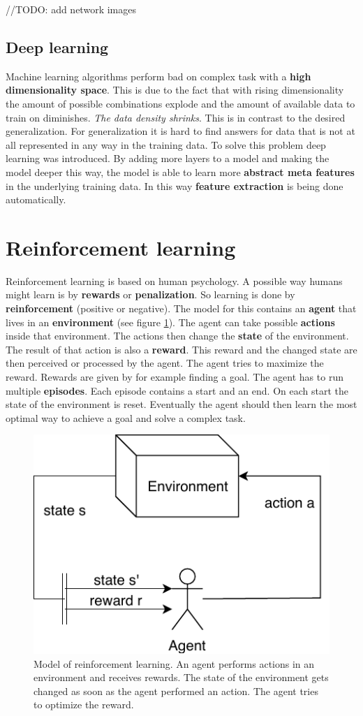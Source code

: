 \documentclass[jou,apacite]{apa6}
\begin{document}
//TODO: add network images

\subsection{Deep learning}
Machine learning algorithms perform bad on complex task with a \textbf{high dimensionality space}. This is due to the fact that with rising dimensionality the amount of possible combinations explode and the amount of available data to train on diminishes. \textit{The data density shrinks}. This is in contrast to the desired generalization. For generalization it is hard to find answers for data that is not at all represented in any way in the training data. To solve this problem deep learning was introduced. By adding more layers to a model and making the model deeper this way, the model is able to  learn more \textbf{abstract meta features} in the underlying training data. In this way \textbf{feature extraction} is being done automatically.

\section{Reinforcement learning}
Reinforcement learning is based on human psychology. A possible way humans might learn is by \textbf{rewards} or \textbf{penalization}. So learning is done by \textbf{reinforcement} (positive or negative). The model for this contains an \textbf{agent} that lives in an \textbf{environment} (see figure \ref{fig:reinforcement-learning}). The agent can take possible \textbf{actions} inside that environment. The actions then change the \textbf{state} of the environment. The result of that action is also a \textbf{reward}. This reward and the changed state are then perceived or processed by the agent. The agent tries to maximize the reward. Rewards are given by for example finding a goal. The agent has to run multiple \textbf{episodes}. Each episode contains a start and an end. On each start the state of the environment is reset. Eventually the agent should then learn the most optimal way to achieve a goal and solve a complex task.

\begin{figure}[!htb]
\centering
\includegraphics[width=.3\textwidth]{reinforcement-learning.pdf}
\caption[Model of reinforcement learning]{Model of reinforcement learning. An agent performs actions in an environment and receives rewards. The state of the environment gets changed as soon as the agent performed an action. The agent tries to optimize the reward.}
\label{fig:reinforcement-learning}
\end{figure}
\end{document}

